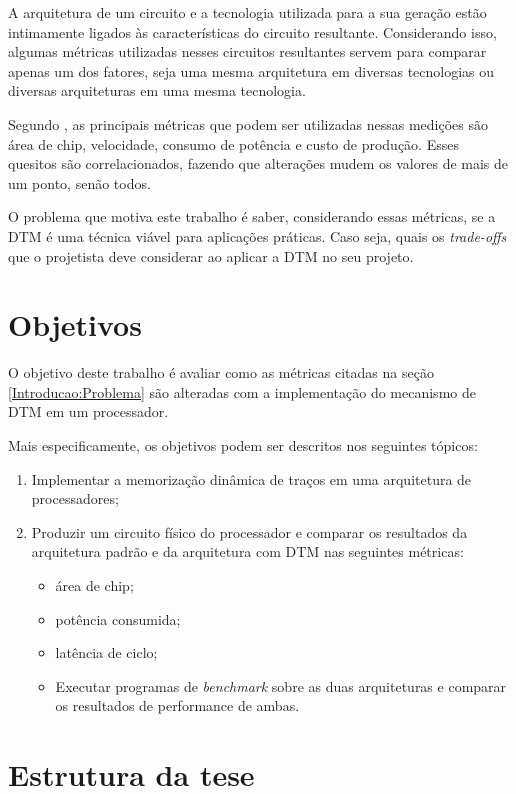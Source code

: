 A arquitetura de um circuito e a tecnologia utilizada para a sua geração estão intimamente ligados às características do circuito resultante. Considerando isso, algumas métricas utilizadas nesses circuitos resultantes servem para comparar apenas um dos fatores, seja uma mesma arquitetura em diversas tecnologias ou diversas arquiteturas em uma mesma tecnologia.

Segundo \cite{chu2006rtl}, as principais métricas que podem ser utilizadas nessas medições são área de chip, velocidade, consumo de potência e custo de produção. Esses quesitos são correlacionados, fazendo que alterações mudem os valores de mais de um ponto, senão todos.

O problema que motiva este trabalho é saber, considerando essas métricas, se a DTM é uma técnica viável para aplicações práticas. Caso seja, quais os \textit{trade-offs} que o projetista deve considerar ao aplicar a DTM no seu projeto.

\section{Objetivos}\label{Introducao:Objetivos} %

O objetivo deste trabalho é avaliar como as métricas citadas na seção \ref{Introducao:Problema} são alteradas com a implementação do mecanismo de DTM em um processador.

Mais especificamente, os objetivos podem ser descritos nos seguintes tópicos:
\begin{enumerate}
	\item Implementar a memorização dinâmica de traços em uma arquitetura de processadores;
	\item Produzir um circuito físico do processador e comparar os resultados da arquitetura padrão e da arquitetura com DTM nas seguintes métricas:
	\begin{itemize}
		\item área de chip;
		\item potência consumida;
		\item latência de ciclo;
	\item Executar programas de \textit{benchmark} sobre as duas arquiteturas e comparar os resultados de performance de ambas.
	\end{itemize}
\end{enumerate}

\section{Estrutura da tese}\label{Introducao:Estrutura}

